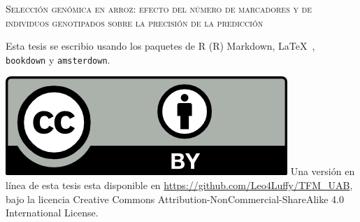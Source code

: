 \documentclass[11pt,spanish,a4paper,oneside,]{book} %
\begin{document}
\frontmatter
\thispagestyle{empty}
\def\drop{.1\textheight}

\vspace*{\drop}
\begin{center}
\Huge \textsc{Selección genómica en arroz: efecto del número de marcadores y de individuos genotipados sobre la precisión de la predicción}
\end{center}

\clearpage
\thispagestyle{empty}
\vspace*{\fill}
\begingroup %
\small
\setlength{\parskip}{\baselineskip} %
\setlength\parindent{0pt} %

Esta tesis se escribio usando los paquetes de R (R) Markdown, \LaTeX\ , \verb+bookdown+  y \verb+amsterdown+.

\vspace{\baselineskip}
\includegraphics{_bookdown_files/CC-BY.png} \newline
Una versión en línea de esta tesis esta disponible en 
\url{https://github.com/Leo4Luffy/TFM_UAB},
bajo la licencia Creative Commons Attribution-NonCommercial-ShareAlike 4.0 International License.
\endgroup
\end{document}
